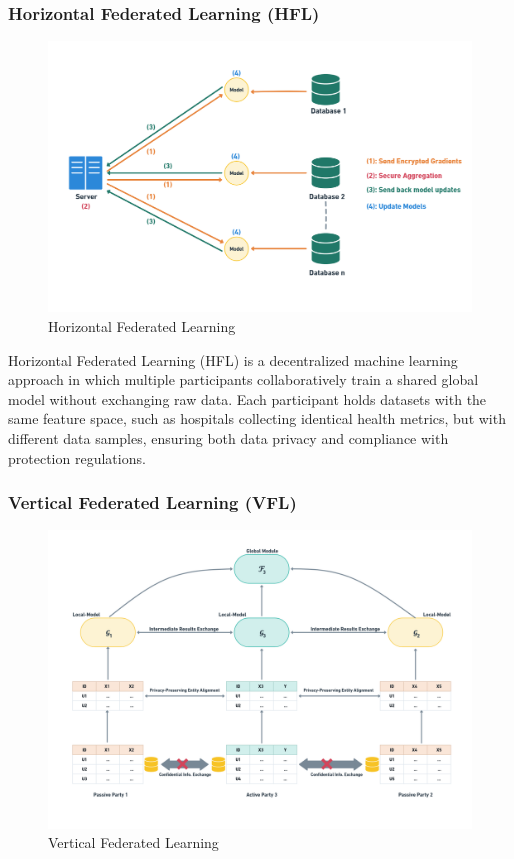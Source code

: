 \subsubsection{Horizontal Federated Learning (HFL)}
\begin{figure}[H]
    \centering
    \includegraphics[width=0.75\linewidth]{Figures/diagram 1 (2).png}
    \caption{Horizontal Federated Learning}
    \label{fig:enter-label}
\end{figure}

Horizontal Federated Learning (HFL) is a decentralized machine learning approach in which multiple participants collaboratively train a shared global model without exchanging raw data. Each participant holds datasets with the same feature space, such as hospitals collecting identical health metrics, but with different data samples, ensuring both data privacy and compliance with protection regulations.




\subsubsection{Vertical Federated Learning (VFL)}
\begin{figure}[H]
    \centering
    \includegraphics[width=0.75\linewidth]{Figures/VFL.png}
    \caption{Vertical Federated Learning}
    \label{fig:enter-label}
\end{figure}

